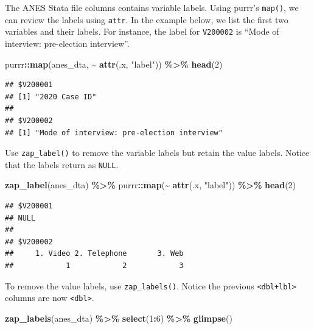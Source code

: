 \documentclass[
]{krantz}
\makeatletter
\newenvironment{Shaded}{\begin{snugshade}}{\end{snugshade}}
\newcommand{\DecValTok}[1]{\textcolor[rgb]{0.06,0.06,0.06}{#1}}
\newcommand{\FunctionTok}[1]{\textcolor[rgb]{0.27,0.27,0.27}{\textbf{#1}}}
\newcommand{\NormalTok}[1]{#1}
\newcommand{\SpecialCharTok}[1]{\textcolor[rgb]{0.43,0.43,0.43}{\textbf{#1}}}
\newcommand{\StringTok}[1]{\textcolor[rgb]{0.5,0.5,0.5}{#1}}
\newenvironment{kframe}{%
\medskip{}
\setlength{\fboxsep}{.8em}
 \def\at@end@of@kframe{}%
 \ifinner\ifhmode%
  \def\at@end@of@kframe{\end{minipage}}%
  \begin{minipage}{\columnwidth}%
 \fi\fi%
 \def\FrameCommand##1{\hskip\@totalleftmargin \hskip-\fboxsep
 \colorbox{shadecolor}{##1}\hskip-\fboxsep
     \hskip-\linewidth \hskip-\@totalleftmargin \hskip\columnwidth}%
 \MakeFramed {\advance\hsize-\width
   \@totalleftmargin\z@ \linewidth\hsize
   \@setminipage}}%
 {\par\unskip\endMakeFramed%
 \at@end@of@kframe}
\renewenvironment{Shaded}{\begin{kframe}}{\end{kframe}}
\makeatother
\begin{document}
The ANES Stata file columns contains variable labels. Using purrr's \texttt{map()}, we can review the labels using \texttt{attr}. In the example below, we list the first two variables and their labels. For instance, the label for \texttt{V200002} is ``Mode of interview: pre-election interview''.

\begin{Shaded}
\begin{Highlighting}[]
\NormalTok{purrr}\SpecialCharTok{::}\FunctionTok{map}\NormalTok{(anes\_dta, }\SpecialCharTok{\textasciitilde{}} \FunctionTok{attr}\NormalTok{(.x, }\StringTok{"label"}\NormalTok{)) }\SpecialCharTok{\%\textgreater{}\%}
  \FunctionTok{head}\NormalTok{(}\DecValTok{2}\NormalTok{)}
\end{Highlighting}
\end{Shaded}

\begin{verbatim}
## $V200001
## [1] "2020 Case ID"
## 
## $V200002
## [1] "Mode of interview: pre-election interview"
\end{verbatim}

Use \texttt{zap\_label()} to remove the variable labels but retain the value labels. Notice that the labels return as \texttt{NULL}.

\begin{Shaded}
\begin{Highlighting}[]
\FunctionTok{zap\_label}\NormalTok{(anes\_dta) }\SpecialCharTok{\%\textgreater{}\%}
\NormalTok{  purrr}\SpecialCharTok{::}\FunctionTok{map}\NormalTok{(}\SpecialCharTok{\textasciitilde{}} \FunctionTok{attr}\NormalTok{(.x, }\StringTok{"label"}\NormalTok{)) }\SpecialCharTok{\%\textgreater{}\%}
  \FunctionTok{head}\NormalTok{(}\DecValTok{2}\NormalTok{)}
\end{Highlighting}
\end{Shaded}

\begin{verbatim}
## $V200001
## NULL
## 
## $V200002
##     1. Video 2. Telephone       3. Web 
##            1            2            3
\end{verbatim}

To remove the value labels, use \texttt{zap\_labels()}. Notice the previous \texttt{\textless{}dbl+lbl\textgreater{}} columns are now \texttt{\textless{}dbl\textgreater{}}.

\begin{Shaded}
\begin{Highlighting}[]
\FunctionTok{zap\_labels}\NormalTok{(anes\_dta) }\SpecialCharTok{\%\textgreater{}\%}
  \FunctionTok{select}\NormalTok{(}\DecValTok{1}\SpecialCharTok{:}\DecValTok{6}\NormalTok{) }\SpecialCharTok{\%\textgreater{}\%}
  \FunctionTok{glimpse}\NormalTok{()}
\end{Highlighting}
\end{Shaded}
\end{document}
